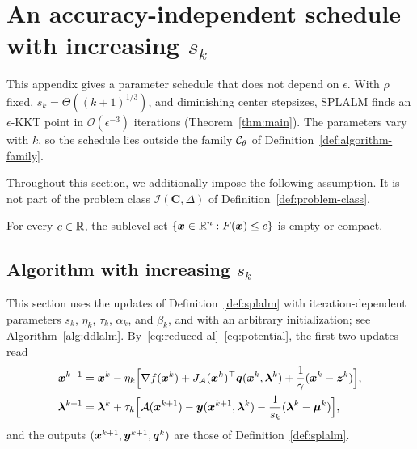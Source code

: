 \section{An accuracy-independent schedule with increasing \texorpdfstring{$s_k$}{s\_k}}
\label{sec:upper-bound}

This appendix gives a parameter schedule that does not depend on
\(\epsilon\). With \(\rho\) fixed, \(s_k=\Theta((k+1)^{1/3})\), and diminishing
center stepsizes, SPLALM finds an \(\epsilon\)-KKT point in
\(\mathcal O(\epsilon^{-3})\) iterations (Theorem~\ref{thm:main}). The
parameters vary with \(k\), so the schedule lies outside the family
\(\mathcal{C}_\theta\) of Definition~\ref{def:algorithm-family}.

Throughout this section, we additionally impose the following assumption.
It is not part of the problem class \(\mathcal I(\mathbf C,\Delta)\) of
Definition~\ref{def:problem-class}.

\begin{assumption}
\label{ass:level-boundedness}
For every \(c\in\mathbb{R}\), the sublevel set
\(\{\bm{x}\in\mathbb{R}^n:F(\bm{x})\le c\}\) is empty or compact.
\end{assumption}

\subsection{Algorithm with increasing \texorpdfstring{$s_k$}{s\_k}}
\label{sec:method}

This section uses the updates of Definition~\ref{def:splalm} with
iteration-dependent parameters \(s_k\), \(\eta_k\), \(\tau_k\), \(\alpha_k\),
and \(\beta_k\), and with an arbitrary initialization; see
Algorithm~\ref{alg:ddlalm}. By~\eqref{eq:reduced-al}--\eqref{eq:potential},
the first two updates read
\begin{equation}\label{eq:explicit-updates}
    \begin{aligned}
        \bm{x}^{k+1}
        &=
        \bm{x}^k-\eta_k
        \Bigl[
            \nabla f(\bm{x}^k)
            +J_{\mathcal{A}}(\bm{x}^k)^\top\bm{q}(\bm{x}^k,\bm{\lambda}^k)
            +\frac{1}{\gamma}(\bm{x}^k-\bm{z}^k)
        \Bigr], \\
        \bm{\lambda}^{k+1}
        &=
        \bm{\lambda}^k+\tau_k
        \Bigl[
            \mathcal{A}(\bm{x}^{k+1})
            -\bm{y}(\bm{x}^{k+1},\bm{\lambda}^k)
            -\frac{1}{s_k}(\bm{\lambda}^k-\bm{\mu}^k)
        \Bigr],
    \end{aligned}
\end{equation}
and the outputs \((\bm{x}^{k+1},\bm{y}^{k+1},\bm{q}^k)\) are those of
Definition~\ref{def:splalm}.

